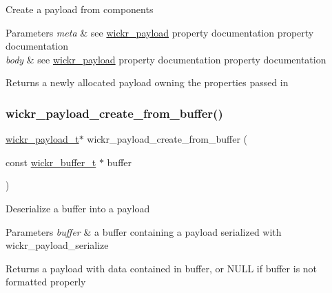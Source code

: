 Create a payload from components


\begin{DoxyParams}{Parameters}
{\em meta} & see \textquotesingle{}\mbox{\hyperlink{structwickr__payload}{wickr\+\_\+payload}}\textquotesingle{} property documentation property documentation \\
\hline
{\em body} & see \textquotesingle{}\mbox{\hyperlink{structwickr__payload}{wickr\+\_\+payload}}\textquotesingle{} property documentation property documentation \\
\hline
\end{DoxyParams}
\begin{DoxyReturn}{Returns}
a newly allocated payload owning the properties passed in 
\end{DoxyReturn}
\mbox{\label{group__wickr__payload_ga0965051bd564c60fa3f890185e271a2d}} 
\subsubsection{\texorpdfstring{wickr\_payload\_create\_from\_buffer()}{wickr\_payload\_create\_from\_buffer()}}
{\footnotesize\ttfamily \mbox{\hyperlink{structwickr__payload}{wickr\+\_\+payload\+\_\+t}}$\ast$ wickr\+\_\+payload\+\_\+create\+\_\+from\+\_\+buffer (\begin{DoxyParamCaption}\item[{const \mbox{\hyperlink{structwickr__buffer}{wickr\+\_\+buffer\+\_\+t}} $\ast$}]{buffer }\end{DoxyParamCaption})}

Deserialize a buffer into a payload


\begin{DoxyParams}{Parameters}
{\em buffer} & a buffer containing a payload serialized with \textquotesingle{}wickr\+\_\+payload\+\_\+serialize\textquotesingle{} \\
\hline
\end{DoxyParams}
\begin{DoxyReturn}{Returns}
a payload with data contained in \textquotesingle{}buffer\textquotesingle{}, or N\+U\+LL if \textquotesingle{}buffer\textquotesingle{} is not formatted properly 
\end{DoxyReturn}
\mbox{\label{group__wickr__payload_gaeeebf95ba580b92254a91009245028ee}} 
